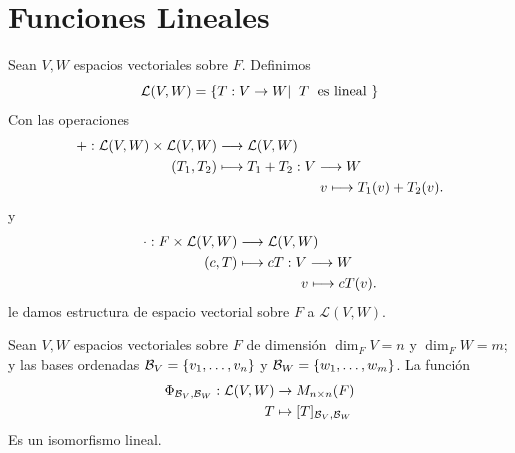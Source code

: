 \documentclass[12pt,a4paper]{book}
\newcommand{\llaves}[1]{\{#1\}}
\begin{document}
    \section{Funciones Lineales}

    Sean $V, W$ espacios vectoriales sobre $F$. Definimos
    \begin{equation*}
        \mathcal{L}(V, W) = \llaves{T:V \to W |\;\;T \text{\; es lineal }}
    \end{equation*}
    Con las operaciones
    \begin{equation*}
        \begin{aligned}
            +:\mathcal{L}(V,W)\times\mathcal{L}(V,W) & \longrightarrow \mathcal{L}(V,W) \\
            (T_{1},T_{2}) & \longmapsto T_{1}+T_{2}:V\longrightarrow W \\
            &\hspace{2.6cm} v\longmapsto T_{1}(v)+T_{2}(v).
        \end{aligned}
    \end{equation*}
    y
    \begin{equation*}
        \begin{aligned}
            \cdot: F \times\mathcal{L}(V,W)
            &\longrightarrow \mathcal{L}(V,W) \\
            (c,T)
            &\longmapsto cT:V\longrightarrow W \\
            &\hspace{1.6cm} v\longmapsto cT(v).
        \end{aligned}
    \end{equation*}
    le damos estructura de espacio vectorial sobre $F$ a $\mathcal{L}(V,W)$.

    \begin{teorema}
        Sean $V, W$ espacios vectoriales sobre $F$ de dimensión $\dim_FV = n$ y $\dim_FW = m$; y las bases ordenadas $\BB_V = \llaves{v_1, \dots, v_n}$ y $\BB_W = \llaves{w_1, \dots, w_m}$. La función
        \begin{align*}
            \Phi_{\mathcal{B}_V, \mathcal{B}_W}: \mathcal{L}(V, W) & \to M_{n \times n}(F)\\
            T & \mapsto [T]_{\mathcal{B}_V, \mathcal{B}_W} 
        \end{align*}
        Es un isomorfismo lineal.
    \end{teorema}
\end{document}
